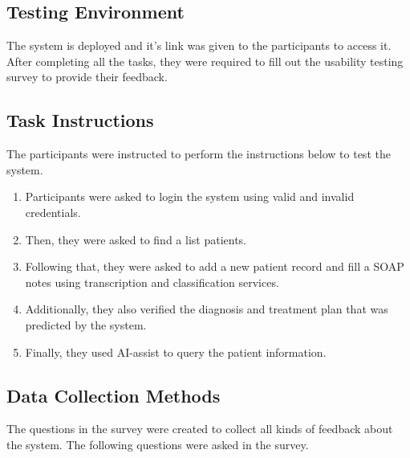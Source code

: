 \documentclass{article}
\begin{document}
\subsection{Testing Environment}

The system is deployed and it's link was given to the participants to access it. After completing all the tasks, they were required to fill out the usability testing survey to provide their feedback.

\subsection{Task Instructions}

The participants were instructed to perform the instructions below to test the system.

\begin{enumerate}
    \item Participants were asked to login the system using valid and invalid credentials.
    \item Then, they were asked to find a list patients.
    \item Following that, they were asked to add a new patient record and fill a SOAP notes using transcription and classification services.
    \item Additionally, they also verified the diagnosis and treatment plan that was predicted by the system.
    \item Finally, they used AI-assist to query the patient information.
\end{enumerate}

\subsection{Data Collection Methods}

The questions in the survey were created to collect all kinds of feedback about the system. The following questions were asked in the survey.
\end{document}
